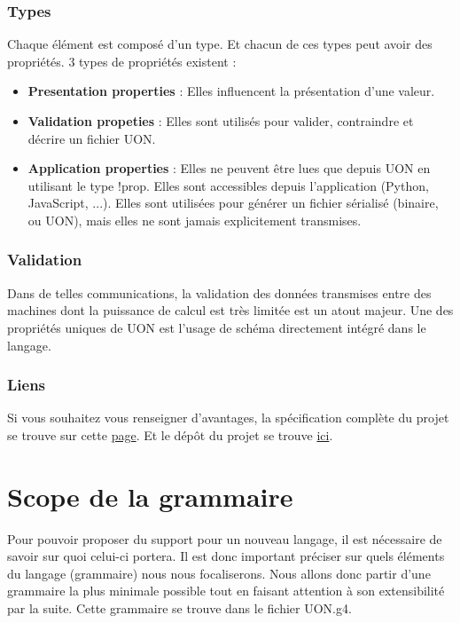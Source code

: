\documentclass[
    iict, %
    il, %
]{heig-tb}
\begin{document}
\subsection{Types}
Chaque élément est composé d'un type. Et chacun de ces types peut avoir des propriétés.
3 types de propriétés existent :
\begin{itemize}
    \item \textbf{Presentation properties} : Elles influencent la présentation d'une valeur.
    \item \textbf{Validation propeties} : Elles sont utilisés pour valider, contraindre et décrire un fichier UON.
    \item \textbf{Application properties} : Elles ne peuvent être lues que depuis UON en utilisant le type !prop. Elles sont accessibles depuis l'application (Python, JavaScript, ...). Elles sont utilisées pour générer un fichier sérialisé (binaire, ou UON), mais elles ne sont jamais explicitement transmises.
\end{itemize}

\subsection{Validation}
Dans de telles communications, la validation des données transmises entre des machines dont la puissance de calcul est très limitée est un atout majeur.
Une des propriétés uniques de UON est l'usage de schéma directement intégré dans le langage.

\subsection{Liens}
Si vous souhaitez vous renseigner d'avantages, la spécification complète du projet se trouve sur cette \href{https://github.com/uon-language/specification/}{page}.
Et le dépôt du projet se trouve \href{https://github.com/uon-language/specification}{ici}.

\chapter{Scope de la grammaire}\label{grammar scope}
Pour pouvoir proposer du support pour un nouveau langage, il est nécessaire de savoir sur quoi celui-ci portera. Il est donc important préciser sur quels éléments du langage (grammaire) nous nous focaliserons.
Nous allons donc partir d'une grammaire la plus minimale possible tout en faisant attention à son extensibilité par la suite.
Cette grammaire se trouve dans le fichier UON.g4.
\end{document}
